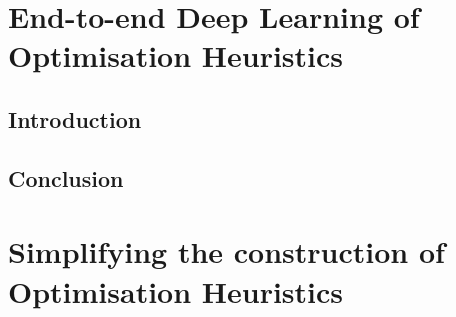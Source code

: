 \ifstapled
\chapter{End-to-end Deep Learning of Optimisation Heuristics}
\section{Introduction}
\lipsum[1-2]

\section{Conclusion}
\lipsum[1-2]
\else
\chapter{Simplifying the construction of Optimisation Heuristics}
\label{chap:deeptune}








\fi

